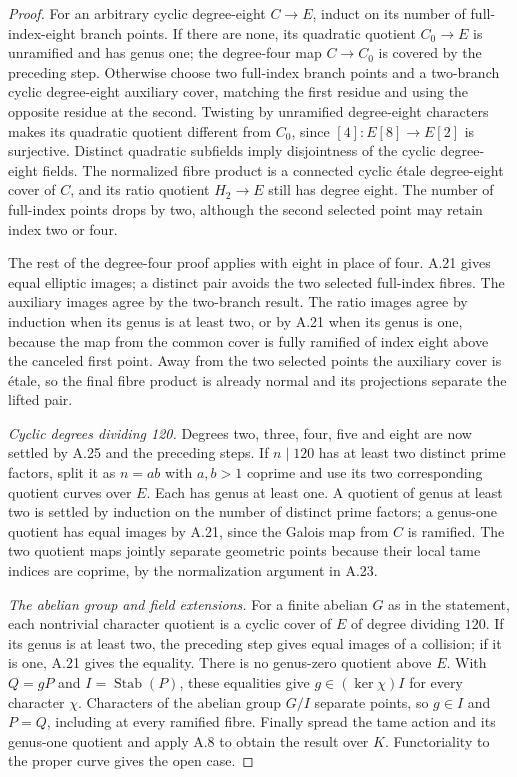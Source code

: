 \begin{proof}
For an arbitrary cyclic degree-eight $C\to E$, induct
on its number of full-index-eight branch points. If
there are none, its quadratic quotient $C_0\to E$ is
unramified and has genus one; the degree-four map
$C\to C_0$ is covered by the preceding step. Otherwise
choose two full-index branch points and a two-branch
cyclic degree-eight auxiliary cover, matching the first
residue and using the opposite residue at the second.
Twisting by unramified degree-eight characters makes
its quadratic quotient different from $C_0$, since
$[4]:E[8]\to E[2]$ is surjective. Distinct quadratic
subfields imply disjointness of the cyclic degree-eight
fields. The normalized fibre product is a connected
cyclic \'etale degree-eight cover of $C$, and its ratio
quotient $H_2\to E$ still has degree eight. The number
of full-index points drops by two, although the second
selected point may retain index two or four.

The rest of the degree-four proof applies with eight
in place of four. A.21 gives equal elliptic images; a
distinct pair avoids the two selected full-index
fibres. The auxiliary images agree by the two-branch
result. The ratio images agree by induction when its
genus is at least two, or by A.21 when its genus is one,
because the map from the common cover is fully ramified
of index eight above the canceled first point. Away
from the two selected points the auxiliary cover is
\'etale, so the final fibre product is already normal
and its projections separate the lifted pair.

\emph{Cyclic degrees dividing 120.}
Degrees two, three, four, five and eight are now settled by
A.25 and the preceding steps. If $n\mid120$ has at
least two distinct prime factors, split it as $n=ab$
with $a,b>1$ coprime and use its two corresponding
quotient curves over $E$. Each has genus at least one.
A quotient of genus at least two is settled by induction
on the number of distinct prime factors; a genus-one quotient
has equal images by A.21, since the Galois map from $C$
is ramified. The two quotient maps jointly separate
geometric points because their local tame indices are
coprime, by the normalization argument in A.23.

\emph{The abelian group and field extensions.}
For a finite abelian $G$ as in the statement, each
nontrivial character quotient is a cyclic cover of $E$
of degree dividing $120$. If its genus is at least two,
the preceding step gives equal images of a collision;
if it is one, A.21 gives the equality. There is no
genus-zero quotient above $E$. With $Q=gP$ and
$I=\operatorname{Stab}(P)$, these equalities give
$g\in(\ker\chi)I$ for every character $\chi$.
Characters of the abelian group $G/I$ separate points,
so $g\in I$ and $P=Q$, including at every ramified
fibre. Finally spread the tame action and its genus-one
quotient and apply A.8 to obtain the result over $K$.
Functoriality to the proper curve gives the open case.
\end{proof}

